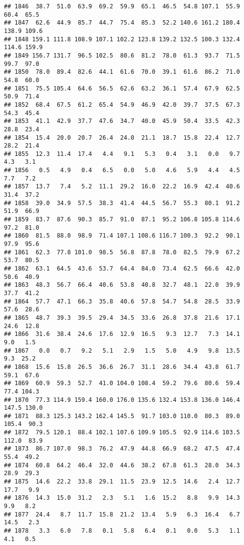 \documentclass[
]{article}
\begin{document}
\begin{verbatim}
## 1846  38.7  51.0  63.9  69.2  59.9  65.1  46.5  54.8 107.1  55.9  60.4  65.5
## 1847  62.6  44.9  85.7  44.7  75.4  85.3  52.2 140.6 161.2 180.4 138.9 109.6
## 1848 159.1 111.8 108.9 107.1 102.2 123.8 139.2 132.5 100.3 132.4 114.6 159.9
## 1849 156.7 131.7  96.5 102.5  80.6  81.2  78.0  61.3  93.7  71.5  99.7  97.0
## 1850  78.0  89.4  82.6  44.1  61.6  70.0  39.1  61.6  86.2  71.0  54.8  60.0
## 1851  75.5 105.4  64.6  56.5  62.6  63.2  36.1  57.4  67.9  62.5  50.9  71.4
## 1852  68.4  67.5  61.2  65.4  54.9  46.9  42.0  39.7  37.5  67.3  54.3  45.4
## 1853  41.1  42.9  37.7  47.6  34.7  40.0  45.9  50.4  33.5  42.3  28.8  23.4
## 1854  15.4  20.0  20.7  26.4  24.0  21.1  18.7  15.8  22.4  12.7  28.2  21.4
## 1855  12.3  11.4  17.4   4.4   9.1   5.3   0.4   3.1   0.0   9.7   4.3   3.1
## 1856   0.5   4.9   0.4   6.5   0.0   5.0   4.6   5.9   4.4   4.5   7.7   7.2
## 1857  13.7   7.4   5.2  11.1  29.2  16.0  22.2  16.9  42.4  40.6  31.4  37.2
## 1858  39.0  34.9  57.5  38.3  41.4  44.5  56.7  55.3  80.1  91.2  51.9  66.9
## 1859  83.7  87.6  90.3  85.7  91.0  87.1  95.2 106.8 105.8 114.6  97.2  81.0
## 1860  81.5  88.0  98.9  71.4 107.1 108.6 116.7 100.3  92.2  90.1  97.9  95.6
## 1861  62.3  77.8 101.0  98.5  56.8  87.8  78.0  82.5  79.9  67.2  53.7  80.5
## 1862  63.1  64.5  43.6  53.7  64.4  84.0  73.4  62.5  66.6  42.0  50.6  40.9
## 1863  48.3  56.7  66.4  40.6  53.8  40.8  32.7  48.1  22.0  39.9  37.7  41.2
## 1864  57.7  47.1  66.3  35.8  40.6  57.8  54.7  54.8  28.5  33.9  57.6  28.6
## 1865  48.7  39.3  39.5  29.4  34.5  33.6  26.8  37.8  21.6  17.1  24.6  12.8
## 1866  31.6  38.4  24.6  17.6  12.9  16.5   9.3  12.7   7.3  14.1   9.0   1.5
## 1867   0.0   0.7   9.2   5.1   2.9   1.5   5.0   4.9   9.8  13.5   9.3  25.2
## 1868  15.6  15.8  26.5  36.6  26.7  31.1  28.6  34.4  43.8  61.7  59.1  67.6
## 1869  60.9  59.3  52.7  41.0 104.0 108.4  59.2  79.6  80.6  59.4  77.4 104.3
## 1870  77.3 114.9 159.4 160.0 176.0 135.6 132.4 153.8 136.0 146.4 147.5 130.0
## 1871  88.3 125.3 143.2 162.4 145.5  91.7 103.0 110.0  80.3  89.0 105.4  90.3
## 1872  79.5 120.1  88.4 102.1 107.6 109.9 105.5  92.9 114.6 103.5 112.0  83.9
## 1873  86.7 107.0  98.3  76.2  47.9  44.8  66.9  68.2  47.5  47.4  55.4  49.2
## 1874  60.8  64.2  46.4  32.0  44.6  38.2  67.8  61.3  28.0  34.3  28.9  29.3
## 1875  14.6  22.2  33.8  29.1  11.5  23.9  12.5  14.6   2.4  12.7  17.7   9.9
## 1876  14.3  15.0  31.2   2.3   5.1   1.6  15.2   8.8   9.9  14.3   9.9   8.2
## 1877  24.4   8.7  11.7  15.8  21.2  13.4   5.9   6.3  16.4   6.7  14.5   2.3
## 1878   3.3   6.0   7.8   0.1   5.8   6.4   0.1   0.0   5.3   1.1   4.1   0.5

\end{verbatim}
\end{document}
